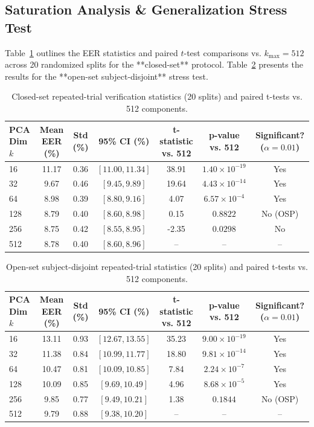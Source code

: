 \documentclass[conference]{IEEEtran}
\begin{document}
\subsection{Saturation Analysis & Generalization Stress Test}
Table~\ref{tab:significance_closed} outlines the EER statistics and paired $t$-test comparisons vs. $k_{\max}=512$ across 20 randomized splits for the **closed-set** protocol. Table~\ref{tab:significance_open} presents the results for the **open-set subject-disjoint** stress test.

\begin{table}[t]
\centering
\caption{Closed-set repeated-trial verification statistics (20 splits) and paired t-tests vs. 512 components.}
\label{tab:significance_closed}
\begin{tabular}{@{}lcccccc@{}}
\toprule
\textbf{PCA Dim $k$} & \textbf{Mean EER (\%)} & \textbf{Std (\%)} & \textbf{95\% CI (\%)} & \textbf{t-statistic vs. 512} & \textbf{p-value vs. 512} & \textbf{Significant? ($\alpha{=}0.01$)} \\
\midrule
16  & 11.17 & 0.36 & $[11.00, 11.34]$ & 38.91 & $1.40 \times 10^{-19}$ & Yes \\
32  & 9.67  & 0.46 & $[9.45, 9.89]$   & 19.64 & $4.43 \times 10^{-14}$ & Yes \\
64  & 8.98  & 0.39 & $[8.80, 9.16]$   & 4.07  & $6.57 \times 10^{-4}$  & Yes \\
128 & 8.79  & 0.40 & $[8.60, 8.98]$   & 0.15  & $0.8822$               & No (OSP) \\
256 & 8.75  & 0.42 & $[8.55, 8.95]$   & -2.35 & $0.0298$               & No \\
512 & 8.78  & 0.40 & $[8.60, 8.96]$   & --    & --                     & -- \\
\bottomrule
\end{tabular}
\end{table}

\begin{table}[t]
\centering
\caption{Open-set subject-disjoint repeated-trial statistics (20 splits) and paired t-tests vs. 512 components.}
\label{tab:significance_open}
\begin{tabular}{@{}lcccccc@{}}
\toprule
\textbf{PCA Dim $k$} & \textbf{Mean EER (\%)} & \textbf{Std (\%)} & \textbf{95\% CI (\%)} & \textbf{t-statistic vs. 512} & \textbf{p-value vs. 512} & \textbf{Significant? ($\alpha{=}0.01$)} \\
\midrule
16  & 13.11 & 0.93 & $[12.67, 13.55]$ & 35.23 & $9.00 \times 10^{-19}$ & Yes \\
32  & 11.38 & 0.84 & $[10.99, 11.77]$ & 18.80 & $9.81 \times 10^{-14}$ & Yes \\
64  & 10.47 & 0.81 & $[10.09, 10.85]$ & 7.84  & $2.24 \times 10^{-7}$  & Yes \\
128 & 10.09 & 0.85 & $[9.69, 10.49]$  & 4.96  & $8.68 \times 10^{-5}$  & Yes \\
256 & 9.85  & 0.77 & $[9.49, 10.21]$  & 1.38  & $0.1844$               & No (OSP) \\
512 & 9.79  & 0.88 & $[9.38, 10.20]$  & --    & --                     & -- \\
\bottomrule
\end{tabular}
\end{table}
\end{document}
